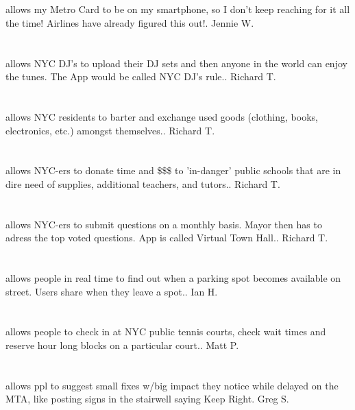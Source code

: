 \section{}allows my Metro Card to be on my smartphone,  so I don't keep reaching for it all the time!  Airlines have already figured this out!. Jennie W.
\section{}allows NYC DJ's to upload their DJ sets and then anyone in the world can enjoy the tunes. The App would be called NYC DJ's rule.. Richard T.
\section{}allows NYC residents to barter and exchange used goods (clothing,  books,  electronics,  etc.) amongst themselves.. Richard T.
\section{}allows NYC-ers to donate time and \$\$\$ to 'in-danger' public schools that are in dire need of supplies,  additional teachers,  and tutors.. Richard T.
\section{}allows NYC-ers to submit questions on a monthly basis. Mayor then has to adress the top voted questions. App is called Virtual Town Hall.. Richard T.
\section{}allows people in real time to find out when a parking spot becomes available on street. Users share when they leave a spot.. Ian H.
\section{}allows people to check in at NYC public tennis courts,  check wait times and reserve hour long blocks on a particular court.. Matt P.
\section{}allows ppl to suggest small fixes w/big impact they notice while delayed on the MTA,  like posting signs in the stairwell saying Keep Right. Greg S.
